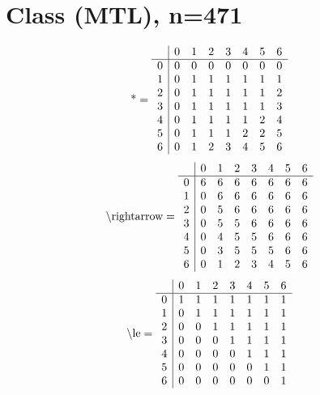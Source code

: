 \documentclass[11pt]{article}
\begin{document}
\section{Class (MTL), n=471}
\[\text{*} = 
\begin{array}{r | r r r r r r r}
 & 0 & 1 & 2 & 3 & 4 & 5 & 6 \\ \hline
0 & 0 & 0 & 0 & 0 & 0 & 0 & 0 \\
1 & 0 & 1 & 1 & 1 & 1 & 1 & 1 \\
2 & 0 & 1 & 1 & 1 & 1 & 1 & 2 \\
3 & 0 & 1 & 1 & 1 & 1 & 1 & 3 \\
4 & 0 & 1 & 1 & 1 & 1 & 2 & 4 \\
5 & 0 & 1 & 1 & 1 & 2 & 2 & 5 \\
6 & 0 & 1 & 2 & 3 & 4 & 5 & 6 \\
\end{array}
\]
\[\text{\textbackslash rightarrow} = 
\begin{array}{r | r r r r r r r}
 & 0 & 1 & 2 & 3 & 4 & 5 & 6 \\ \hline
0 & 6 & 6 & 6 & 6 & 6 & 6 & 6 \\
1 & 0 & 6 & 6 & 6 & 6 & 6 & 6 \\
2 & 0 & 5 & 6 & 6 & 6 & 6 & 6 \\
3 & 0 & 5 & 5 & 6 & 6 & 6 & 6 \\
4 & 0 & 4 & 5 & 5 & 6 & 6 & 6 \\
5 & 0 & 3 & 5 & 5 & 5 & 6 & 6 \\
6 & 0 & 1 & 2 & 3 & 4 & 5 & 6 \\
\end{array}
\]
\[\text{\textbackslash le} = 
\begin{array}{r | r r r r r r r}
 & 0 & 1 & 2 & 3 & 4 & 5 & 6 \\ \hline
0 & 1 & 1 & 1 & 1 & 1 & 1 & 1 \\
1 & 0 & 1 & 1 & 1 & 1 & 1 & 1 \\
2 & 0 & 0 & 1 & 1 & 1 & 1 & 1 \\
3 & 0 & 0 & 0 & 1 & 1 & 1 & 1 \\
4 & 0 & 0 & 0 & 0 & 1 & 1 & 1 \\
5 & 0 & 0 & 0 & 0 & 0 & 1 & 1 \\
6 & 0 & 0 & 0 & 0 & 0 & 0 & 1 \\
\end{array}
\]
\end{document}
